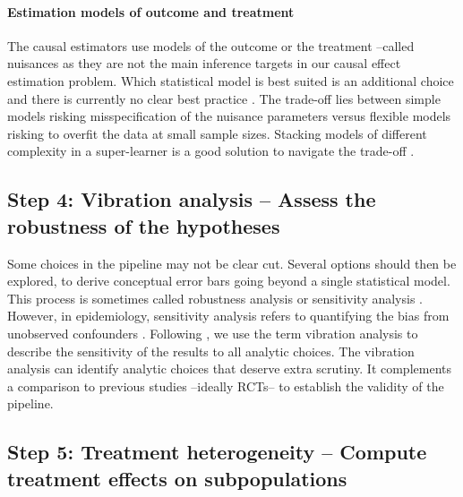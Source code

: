 \documentclass[french,12pt,twoside,a4paper]{book}
\begin{document}
\paragraph{Estimation models of outcome and treatment}

The causal estimators use models of the outcome or the treatment --called
nuisances as they are not the main inference targets in our causal effect
estimation problem. Which statistical model is best suited is an additional
choice and there is currently no clear best practice
\citep{wendling2018comparing, dorie2019automated}. The trade-off lies between
simple models risking misspecification of the nuisance parameters versus
flexible models risking to overfit the data at small sample sizes. Stacking
models of different complexity in a super-learner is a good solution to navigate
the trade-off \citep{van2007super,doutreligne2023select}.

\subsection{Step 4: Vibration analysis -- Assess the robustness of the hypotheses}
\label{subsec:causal_tuto:vibration_analysis}%

Some choices in the pipeline may not be clear cut. Several options should then
be explored, to derive conceptual error bars going beyond a single statistical
model. This process is sometimes called robustness analysis
\citep{neumayer2017robustness} or sensitivity analysis
\citep{thabane2013tutorial, hernan2020causal,fda_statistical_2021}. However, in
epidemiology, sensitivity analysis refers to quantifying the bias from
unobserved confounders \citep{schneeweiss2006sensitivity}. Following
\cite{patel2015assessment}, we use the term vibration analysis to describe the
sensitivity of the results to all analytic choices.
%
The vibration analysis can identify analytic choices that deserve extra
scrutiny. It complements a comparison to previous studies --ideally RCTs-- to
establish the validity of the pipeline.



\subsection{Step 5: Treatment heterogeneity -- Compute treatment effects on subpopulations}%
\label{subsec:causal_tuto:heterogeneity}%
\end{document}
